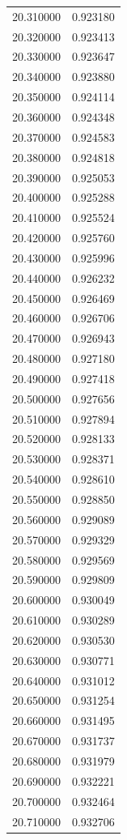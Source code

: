 \begin{tabular}{rr}
20.310000 & 0.923180 \\
20.320000 & 0.923413 \\
20.330000 & 0.923647 \\
20.340000 & 0.923880 \\
20.350000 & 0.924114 \\
20.360000 & 0.924348 \\
20.370000 & 0.924583 \\
20.380000 & 0.924818 \\
20.390000 & 0.925053 \\
20.400000 & 0.925288 \\
20.410000 & 0.925524 \\
20.420000 & 0.925760 \\
20.430000 & 0.925996 \\
20.440000 & 0.926232 \\
20.450000 & 0.926469 \\
20.460000 & 0.926706 \\
20.470000 & 0.926943 \\
20.480000 & 0.927180 \\
20.490000 & 0.927418 \\
20.500000 & 0.927656 \\
20.510000 & 0.927894 \\
20.520000 & 0.928133 \\
20.530000 & 0.928371 \\
20.540000 & 0.928610 \\
20.550000 & 0.928850 \\
20.560000 & 0.929089 \\
20.570000 & 0.929329 \\
20.580000 & 0.929569 \\
20.590000 & 0.929809 \\
20.600000 & 0.930049 \\
20.610000 & 0.930289 \\
20.620000 & 0.930530 \\
20.630000 & 0.930771 \\
20.640000 & 0.931012 \\
20.650000 & 0.931254 \\
20.660000 & 0.931495 \\
20.670000 & 0.931737 \\
20.680000 & 0.931979 \\
20.690000 & 0.932221 \\
20.700000 & 0.932464 \\
20.710000 & 0.932706 \\

\end{tabular}
